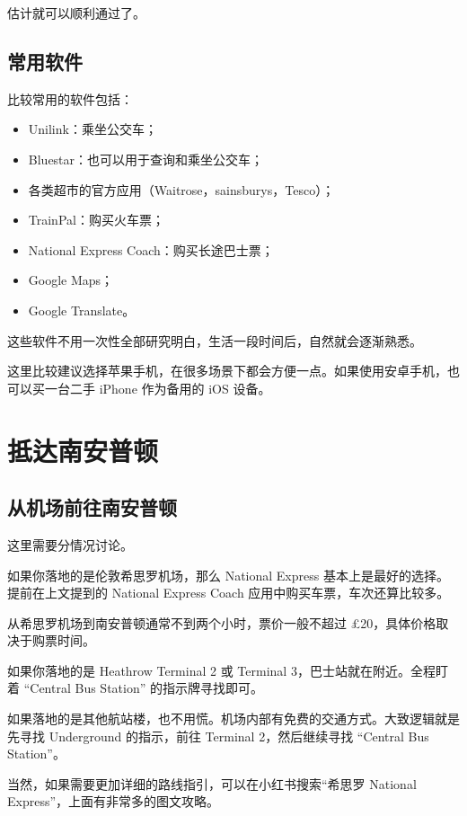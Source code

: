 \documentclass[UTF8,12pt,a4paper]{ctexart}
\begin{document}
估计就可以顺利通过了。

\subsection{常用软件}

比较常用的软件包括：

\begin{itemize}
    \item Unilink：乘坐公交车；
    \item Bluestar：也可以用于查询和乘坐公交车；
    \item 各类超市的官方应用（Waitrose，sainsburys，Tesco）；
    \item TrainPal：购买火车票；
    \item National Express Coach：购买长途巴士票；
    \item Google Maps；
    \item Google Translate。
\end{itemize}

这些软件不用一次性全部研究明白，生活一段时间后，自然就会逐渐熟悉。

这里比较建议选择苹果手机，在很多场景下都会方便一点。如果使用安卓手机，也可以买一台二手 iPhone 作为备用的 iOS 设备。

\section{抵达南安普顿}

\subsection{从机场前往南安普顿}

这里需要分情况讨论。

如果你落地的是伦敦希思罗机场，那么 National Express 基本上是最好的选择。提前在上文提到的 National Express Coach 应用中购买车票，车次还算比较多。

从希思罗机场到南安普顿通常不到两个小时，票价一般不超过 \pounds{}20，具体价格取决于购票时间。

如果你落地的是 Heathrow Terminal 2 或 Terminal 3，巴士站就在附近。全程盯着 ``Central Bus Station'' 的指示牌寻找即可。

如果落地的是其他航站楼，也不用慌。机场内部有免费的交通方式。大致逻辑就是先寻找 Underground 的指示，前往 Terminal 2，然后继续寻找 ``Central Bus Station''。

当然，如果需要更加详细的路线指引，可以在小红书搜索“希思罗 National Express”，上面有非常多的图文攻略。
\end{document}

